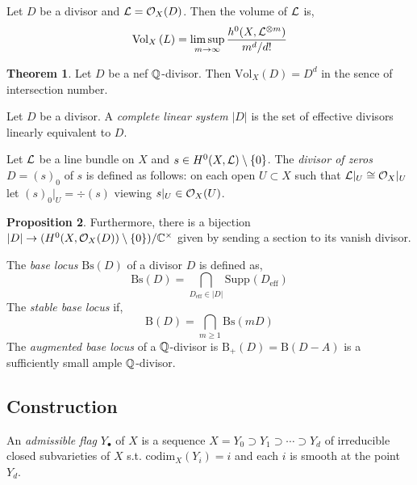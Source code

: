 \documentclass[12pt]{extarticle}
\newcommand{\C}{\mathbb{C}}
\theoremstyle{definition}
\newtheorem{theorem}{Theorem}[section]
\newtheorem{proposition}[theorem]{Proposition}
\newenvironment{definition}[1][Definition:]{\begin{trivlist}
\item[\hskip \labelsep {\bfseries #1}]}{\end{trivlist}}
\newcommand{\Vol}[2]{\mathrm{Vol}_{#1}\left( #2 \right)}
\begin{document}
\begin{definition}
Let $D$ be a divisor and $\mathcal{L} = \mathcal{O}_{X}(D)$. Then the volume of $\mathcal{L}$ is,
\[ \Vol{X}{L} = \limsup_{m \to \infty} \frac{h^0(X, \L^{\otimes m})}{m^d / d !} \]
\end{definition}

\begin{theorem}
Let $D$ be a nef $\mathbb{Q}$-divisor. Then $\Vol{X}{D} = D^d$ in the sence of intersection number.
\end{theorem}

\begin{definition}
Let $D$ be a divisor. A \textit{complete linear system} $|D|$ is the set of effective divisors linearly equivalent to $D$.
\end{definition}

\begin{definition}
Let $\mathcal{L}$ be a line bundle on $X$ and $s \in H^0(X, \mathcal{L}) \setminus \{ 0 \}$. The \textit{divisor of zeros} $D = (s)_0$ of $s$ is defined as follows: on each open $U \subset X$ such that $\mathcal{L} |_U \cong \mathcal{O}_{X}|_U$ let $(s)_0 |_U = \div{(s)}$ viewing $s|_U \in \mathcal{O}_{X}(U)$. 
\end{definition}

\begin{proposition}
Furthermore, there is a bijection $|D| \to (H^0(X, \struct{X}(D)) \setminus \{ 0 \}) / \C^\times$ given by sending a section to its vanish divisor.
\end{proposition}

\newcommand{\Bs}{\mathrm{Bs}}
\newcommand{\Supp}[2]{\mathrm{Supp}_{#1}(#2)}

\begin{definition}
The \textit{base locus} $\Bs(D)$ of a divisor $D$ is defined as,
\[ \Bs(D) = \bigcap_{D_{\text{eff}} \in |D|} \Supp{}{D_{\text{eff}}} \]
The \textit{stable base locus} if,
\[ \mathrm{B}(D) = \bigcap_{m \ge 1} \Bs(m D) \]
The \textit{augmented base locus} of a $\mathbb{Q}$-divisor is $\mathrm{B}_+(D) = \mathrm{B}(D - A)$ is a sufficiently small ample $\mathbb{Q}$-divisor. 
\end{definition}

\subsection{Construction}

\begin{definition}
An \textit{admissible flag} $Y_\bullet$ of $X$ is a sequence $X = Y_0 \supset Y_1 \supset \cdots \supset Y_d$ of irreducible closed subvarieties of $X$ s.t. $\mathrm{codim}_{X}(Y_i) = i$ and each $i$ is smooth at the point $Y_d$.
\end{definition}
\end{document}
